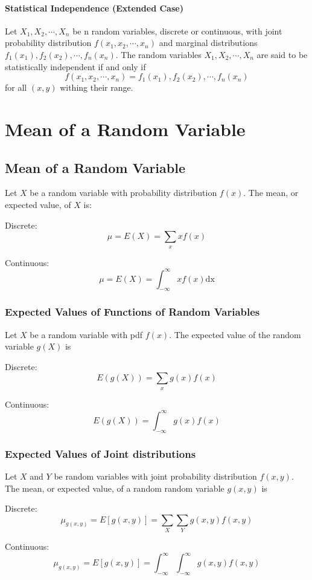 \documentclass{book}
\begin{document}
\subsubsection{Statistical Independence (Extended Case)}
Let $X_1, X_2, \cdots , X_n$ be n random variables, discrete or continuous, with joint probability distribution $f(x_1, x_2, \cdots , x_n)$ and marginal distributions $f_1(x_1), f_2(x_2), \cdots , f_n(x_n)$. The random variables $X_1, X_2, \cdots , X_n$ are said to be statistically independent if and only if
$$f(x_1, x_2, \cdots, x_n) = f_1(x_1), f_2(x_2), \cdots , f_n(x_n)$$
for all $(x,y)$ withing their range.

\chapter{Mean of a Random Variable}

\section{Mean of a Random Variable}
Let $X$ be a random variable with probability distribution $f(x)$. The mean, or expected value, of $X$ is:

Discrete:
	$$\mu = E(X) = \sum_x x f(x)$$ 

Continuous:
	$$\mu = E(X) = \int_{-\infty}^\infty x f(x) \text{dx}$$


\subsection{Expected Values of Functions of Random Variables}

Let $X$ be a random variable with pdf $f(x)$. The expected value of the random variable $g(X)$ is

Discrete:
$$E(g(X))=\sum_x g(x)f(x)$$

Continuous:
$$E(g(X))=\int_{-\infty}^\infty g(x)f(x)$$

\subsection{Expected Values of Joint distributions}
Let $X$ and $Y$ be random variables with joint probability distribution $f(x,y)$. The mean, or expected value, of a random random variable $g(x,y)$ is

Discrete:
$$\mu_{g(x,y)}=E[g(x,y)] = \sum_X \sum_Y g(x,y)f(x,y)$$

Continuous:
$$\mu_{g(x,y)}=E[g(x,y)] = \int_{-\infty}^\infty \int_{-\infty}^\infty g(x,y)f(x,y)$$
\end{document}
